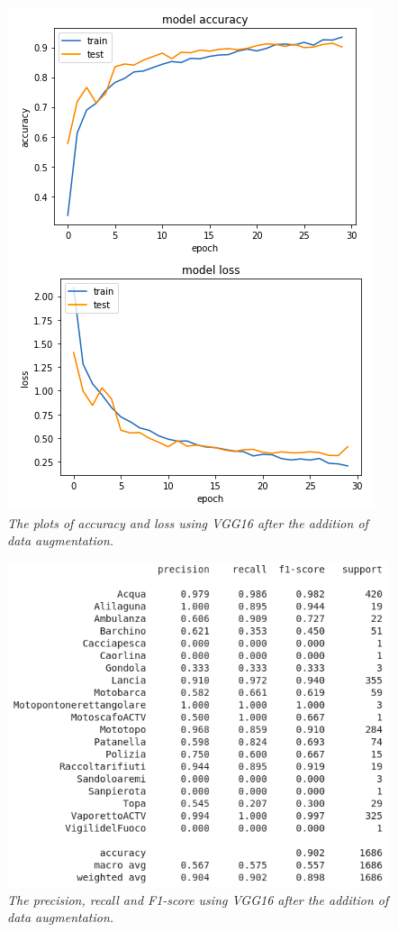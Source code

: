 \documentclass[12pt,a4paper]{report}
\begin{document}
\begin{figure}[H]
\centering
\includegraphics[scale=0.4]{./immagini/vgg16/2_data_augmentation_-_30_epochs_no_stopping_-_no_dropout_-_no_batch_norm/plot_loss_accuracy.png}
\caption{\textit{The plots of accuracy and loss using VGG16 after the addition of data augmentation.}}
\end{figure}
\begin{figure}[H]
\centering
\includegraphics[scale=0.4]{./immagini/vgg16/2_data_augmentation_-_30_epochs_no_stopping_-_no_dropout_-_no_batch_norm/f1.png}
\caption{\textit{The precision, recall and F1-score using VGG16 after the addition of data augmentation.}}
\end{figure}
\end{document}
